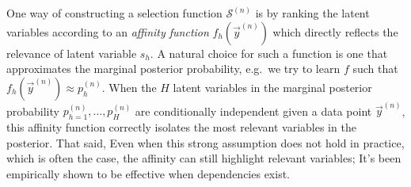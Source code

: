 One way of constructing a selection function $\mathcal{S}^{(n)}$ is by
ranking the latent variables according to an \emph{affinity function} $f_h(\vec{y}^{(n)})$
which directly reflects the relevance of latent variable $s_h$. A natural choice
for such a function is one that approximates the marginal posterior probability,
e.g.\ we try to learn $f$ such that $f_h(\vec{y}^{(n)}) \approx p^{(n)}_h$.
%
When the $H$ latent variables in the marginal posterior probability $p_{h=1}^{(n)},\dots, p_H^{(n)}$ are conditionally independent given a data point $\vec{y}^{(n)}$,  this affinity function correctly isolates the most relevant variables in the posterior.
That said, 
Even when this strong assumption does not hold in practice, which is often the case, 
the affinity can still highlight relevant variables; 
It's been empirically shown to be effective when dependencies exist.

